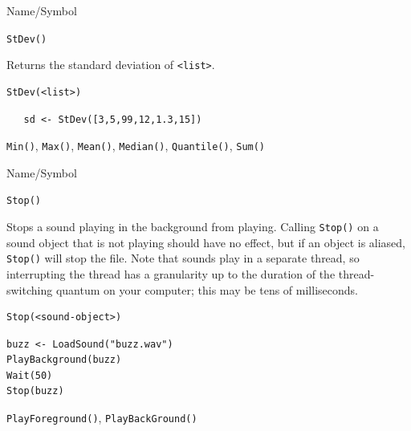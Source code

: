 \begin{desc}{Name/Symbol}
\item[Name/Symbol]  	\verb+StDev()+ 

\item[Description]  Returns the standard deviation of \verb+<list>+.

\item[Usage]       	
\begin{verbatim}
StDev(<list>)        
\end{verbatim}

\item[Example]	
\begin{verbatim}
   sd <- StDev([3,5,99,12,1.3,15])        
\end{verbatim}

\item[See Also]     	\verb+Min()+, \verb+Max()+, \verb+Mean()+, \verb+Median()+, \verb+Quantile()+, \verb+Sum()+
\end{desc}






\begin{desc}{Name/Symbol}
\item[Name/Symbol]  	\verb+Stop()+	

\item[Description] Stops a sound playing in the background from
  playing.  Calling \verb+Stop()+ on a sound object that is not
  playing should have no effect, but if an object is aliased,
  \verb+Stop()+ will stop the file.  Note that sounds play in a
  separate thread, so interrupting the thread has a granularity up to
  the duration of the thread-switching quantum on your computer; this
  may be tens of milliseconds.

\item[Usage]
\begin{verbatim}
Stop(<sound-object>)
\end{verbatim}

\item[Example]     	
\begin{verbatim}
buzz <- LoadSound("buzz.wav")
PlayBackground(buzz)
Wait(50)
Stop(buzz)
\end{verbatim}

\item[See Also]    	\verb+PlayForeground()+, \verb+PlayBackGround()+
\end{desc}





